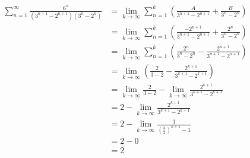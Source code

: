 \begin{align*}
\sum_{n = 1}^{\infty} \frac{6^n}{(3^{n+1} - 2^{n+1})(3^n - 2^n)}
&= \lim_{k \rightarrow \infty} \sum_{n = 1}^{k} \left( \frac{A}{3^{n+1} - 2^{n+1}} + \frac{B}{3^n - 2^n} \right) \\
&= \lim_{k \rightarrow \infty} \sum_{n = 1}^{k} \left( \frac{-2^{n+1}}{3^{n+1} - 2^{n+1}} + \frac{2^n}{3^n - 2^n} \right) \\
&= \lim_{k \rightarrow \infty} \sum_{n = 1}^{k} \left( \frac{2^n}{3^n - 2^n} - \frac{2^{n+1}}{3^{n+1} - 2^{n+1}} \right) \\
&= \lim_{k \rightarrow \infty} \left( \frac{2}{3 - 2} - \frac{2^{k+1}}{3^{k+1} - 2^{k+1}} \right) \\
&= \lim_{k \rightarrow \infty} \frac{2}{3-2} - \lim_{k \rightarrow \infty} \frac{2^{k+1}}{3^{k+1} - 2^{k+1}} \\
&= 2 - \lim_{k \rightarrow \infty} \frac{2^{k+1}}{3^{k+1} - 2^{k+1}} \\
&= 2 - \lim_{k \rightarrow \infty} \frac{1}{(\frac{3}{2})^{k+1} - 1} \\
&= 2 - 0 \\
&= \boxed{2}
\end{align*}
